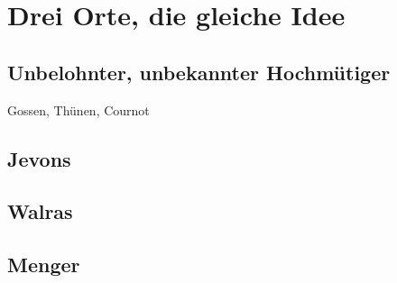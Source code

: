 %
%
%

\chapter{Drei Orte, die gleiche Idee}
\label{Marginalismus}

\section{Unbelohnter, unbekannter Hochmütiger}
\label{Vorläufer}

Gossen, Thünen, Cournot

\section{Jevons}
\label{Jevons}

\section{Walras}
\label{Walras}

\section{Menger}
\label{Wiener Schule}

